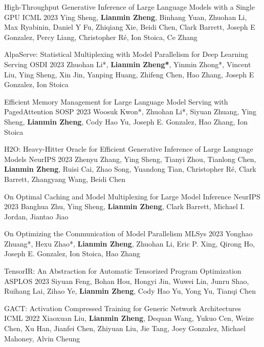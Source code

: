 \begin{cventries}
\cventry
{}
{High-Throughput Generative Inference of Large Language Models with a Single GPU} %
{ICML 2023} %
{} %
{Ying Sheng, \textbf{Lianmin Zheng}, Binhang Yuan, Zhuohan Li, Max Ryabinin, Daniel Y Fu, Zhiqiang Xie, Beidi Chen, Clark Barrett, Joseph E Gonzalez, Percy Liang, Christopher Ré, Ion Stoica, Ce Zhang}

\cventry
{}
{AlpaServe: Statistical Multiplexing with Model Parallelism for Deep Learning Serving} %
{OSDI 2023} %
{} %
{Zhuohan Li*, \textbf{Lianmin Zheng*}, Yinmin Zhong*, Vincent Liu, Ying Sheng, Xin Jin, Yanping Huang, Zhifeng Chen, Hao Zhang, Joseph E Gonzalez, Ion Stoica}

\cventry
{}
{Efficient Memory Management for Large Language Model Serving with PagedAttention} %
{SOSP 2023} %
{} %
{Woosuk Kwon*, Zhuohan Li*, Siyuan Zhuang, Ying Sheng, \textbf{Lianmin Zheng}, Cody Hao Yu, Joseph E. Gonzalez, Hao Zhang, Ion Stoica}

\cventry
{}
{H2O: Heavy-Hitter Oracle for Efficient Generative Inference of Large Language Models} %
{NeurIPS 2023} %
{} %
{Zhenyu Zhang, Ying Sheng, Tianyi Zhou, Tianlong Chen, \textbf{Lianmin Zheng}, Ruisi Cai, Zhao Song, Yuandong Tian, Christopher Ré, Clark Barrett, Zhangyang Wang, Beidi Chen}

\cventry
{}
{On Optimal Caching and Model Multiplexing for Large Model Inference} %
{NeurIPS 2023} %
{} %
{Banghua Zhu, Ying Sheng, \textbf{Lianmin Zheng}, Clark Barrett, Michael I. Jordan, Jiantao Jiao}

\cventry
{}
{On Optimizing the Communication of Model Parallelism} %
{MLSys 2023} %
{} %
{Yonghao Zhuang*, Hexu Zhao*, \textbf{Lianmin Zheng}, Zhuohan Li, Eric P. Xing, Qirong Ho, Joseph E. Gonzalez, Ion Stoica, Hao Zhang}

\cventry
{}
{TensorIR: An Abstraction for Automatic Tensorized Program Optimization} %
{ASPLOS 2023} %
{} %
{Siyuan Feng, Bohan Hou, Hongyi Jin, Wuwei Lin, Junru Shao, Ruihang Lai, Zihao Ye, \textbf{Lianmin Zheng}, Cody Hao Yu, Yong Yu, Tianqi Chen}

\cventry
{}
{GACT: Activation Compressed Training for Generic Network Architectures} %
{ICML 2022} %
{} %
{Xiaoxuan Liu, \textbf{Lianmin Zheng}, Dequan Wang, Yukuo Cen, Weize Chen, Xu Han, Jianfei Chen, Zhiyuan Liu, Jie Tang, Joey Gonzalez, Michael Mahoney, Alvin Cheung}


\end{cventries}

